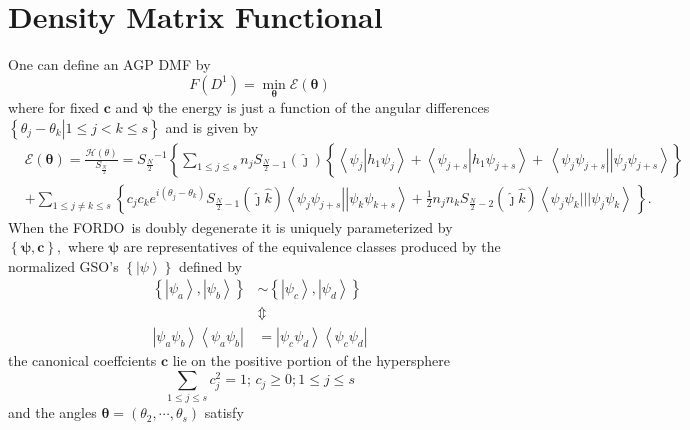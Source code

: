 \documentclass[aps,preprint]{revtex4}%
\begin{document}
\section{Density Matrix Functional}

One can define an AGP DMF by
\[
F\left(  D^{1}\right)  =\min_{\mathbf{\theta}}\mathcal{E}\left(
\mathbf{\theta}\right)
\]
where for fixed $\mathbf{c}$ and $\mathbf{\psi}$ the energy is just a function
of the angular differences $\left\{  \left.  \theta_{j}-\theta_{k}\right\vert
1\leq j<k\leq s\right\}  $ and is given by
\begin{align*}
&  \mathcal{E}\left(  \mathbf{\theta}\right)  =\frac{\mathcal{H}\left(
\theta\right)  }{S_{\frac{N}{2}}}=S_{\frac{N}{2}}{}^{-1}\left\{  \sum_{1\leq
j\leq s}n_{j}S_{\frac{N}{2}-1}\left(  \hat{\jmath}\right)  \left\{  \overset
{}{\left\langle \psi_{j}\left\vert h_{1}\psi_{j}\right.  \right\rangle
+\left\langle \psi_{j+s}\left\vert h_{1}\psi_{j+s}\right.  \right\rangle
}+\,\left\langle \psi_{j}\psi_{j+s}\right\vert \left\vert \psi_{j}\psi
_{j+s}\right\rangle \right\}  \right. \\
&  +\sum_{1\leq j\neq k\leq s}\left\{  c_{j}c_{k}e^{i\left(  \theta_{j}%
-\theta_{k}\right)  }S_{\frac{N}{2}-1}\left(  \hat{\jmath}\hat{k}\right)
\left\langle \psi_{j}\psi_{j+s}\right\vert \left\vert \psi_{k}\psi
_{k+s}\right\rangle +\frac{1}{2}n_{j}n_{k}S_{\frac{N}{2}-2}\left(  \hat
{\jmath}\hat{k}\right)  \left\langle \psi_{j}\psi_{k}|||\psi_{j}\psi
_{k}\right\rangle \,\overset{}{}\right\}  .
\end{align*}
When the FORDO\ is doubly degenerate it is uniquely parameterized by $\left\{
\mathbf{\psi,c}\right\}  ,$ where $\mathbf{\psi}$ are representatives of the
equivalence classes produced by the normalized GSO's $\left\{  \left\vert
\psi\right\rangle \right\}  $ defined by
\begin{align*}
\left\{  \left\vert \psi_{a}\right\rangle ,\left\vert \psi_{b}\right\rangle
\right\}   &  \sim\left\{  \left\vert \psi_{c}\right\rangle ,\left\vert
\psi_{d}\right\rangle \right\} \\
&  \Updownarrow\\
\left\vert \psi_{a}\psi_{b}\right\rangle \left\langle \psi_{a}\psi
_{b}\right\vert  &  =\left\vert \psi_{c}\psi_{d}\right\rangle \left\langle
\psi_{c}\psi_{d}\right\vert
\end{align*}
the canonical coeffcients $\mathbf{c}$ lie on the positive portion of the
hypersphere
\[
\sum\limits_{1\leq j\leq s}c_{j}^{2}=1;\,c_{j}\geq0;1\leq j\leq s
\]
and the angles $\mathbf{\theta}=\left(  \theta_{2},\cdots,\theta_{s}\right)  $ satisfy%
\end{document}
